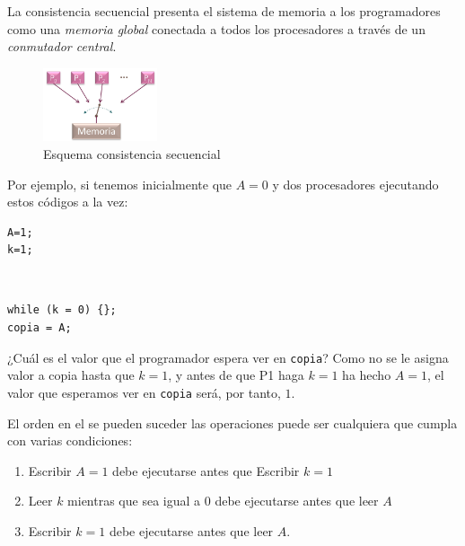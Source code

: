 \documentclass[10pt,a4paper,spanish]{report}
\begin{document}
La consistencia secuencial presenta el sistema de memoria a los programadores como una \textcolor[rgb]{0.2,0.4,0.8}{\textit{memoria global}} conectada a todos los procesadores a través de un \textcolor[rgb]{0.2,0.4,0.8}{\textit{conmutador central}}.

\begin{figure}[!h]
\centering
\includegraphics[width=0.3\textwidth]{75}
\caption{Esquema consistencia secuencial}
\label{cs}
\end{figure}

Por ejemplo, si tenemos inicialmente que $A=0$ y dos procesadores ejecutando estos códigos a la vez:

\begin{center}
\begin{minipage}{0.2\textwidth}
\begin{verbatim}
A=1;
k=1;
\end{verbatim}
\end{minipage}
\begin{minipage}{0.3\textwidth}
\textcolor{White}{.}
\end{minipage}
\begin{minipage}{0.3\textwidth}
\begin{verbatim}
while (k = 0) {};
copia = A;
\end{verbatim}
\end{minipage}
\end{center}

¿Cuál es el valor que el programador espera ver en \verb*|copia|? Como no se le asigna valor a copia hasta que $k=1$, y antes de que P1 haga $k=1$ ha hecho $A=1$, el valor que esperamos ver en \verb*|copia| será, por tanto, $1$.

El orden en el se pueden suceder las operaciones puede ser cualquiera que cumpla con varias condiciones:
\begin{enumerate}[\color{azul}{\bf $\heartsuit$}]
    \item Escribir $A=1$ debe ejecutarse antes que Escribir $k=1$
    \item Leer $k$ mientras que sea igual a $0$ debe ejecutarse antes que leer $A$
    \item Escribir $k=1$ debe ejecutarse antes que leer $A$.
\end{enumerate}
\end{document}
